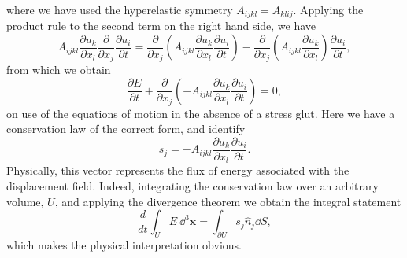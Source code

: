 \documentclass[a4paper,10pt]{paper}
\begin{document}
\begin{enumerate}
\begin{equation*}
\end{equation*}
where we have used the hyperelastic symmetry $A_{ijkl}=A_{klij}$. Applying the product rule to the second term on the right hand side, we have
\begin{equation*}
    A_{ijkl}\frac{\partial u_{k}}{\partial x_{l}}\frac{\partial}{\partial x_{j}}\frac{\partial u_{i}}{\partial t}=\frac{\partial}{\partial x_{j}}\left(A_{ijkl}\frac{\partial u_{k}}{\partial x_{l}}\frac{\partial u_{i}}{\partial t}\right)-\frac{\partial}{\partial x_{j}}\left(A_{ijkl}\frac{\partial u_{k}}{\partial x_{l}}\right)\frac{\partial u_{i}}{\partial t},
\end{equation*}
from which we obtain
\begin{equation*}
    \frac{\partial E}{\partial t}+\frac{\partial}{\partial x_{j}}\left(-A_{ijkl}\frac{\partial u_{k}}{\partial x_{l}}\frac{\partial u_{i}}{\partial t}\right)=0,
\end{equation*}
on use of the equations of motion in the absence of a stress glut. Here we have a conservation law of the correct form, and identify
\begin{equation*}
    s_{j}=-A_{ijkl}\frac{\partial u_{k}}{\partial x_{l}}\frac{\partial u_{i}}{\partial t}.
\end{equation*}
Physically, this vector represents the flux of energy associated with the displacement field. Indeed, integrating the conservation law over an arbitrary volume, $U$, and applying the divergence theorem we obtain the integral statement
\begin{equation*}
    \frac{d}{dt}\int_{U}E~\dd^{3}\mathbf{x}=\int_{\partial U}s_{j}\hat{n}_{j}\dd S,
\end{equation*}
which makes the physical interpretation obvious.


\end{enumerate}
\end{document}
